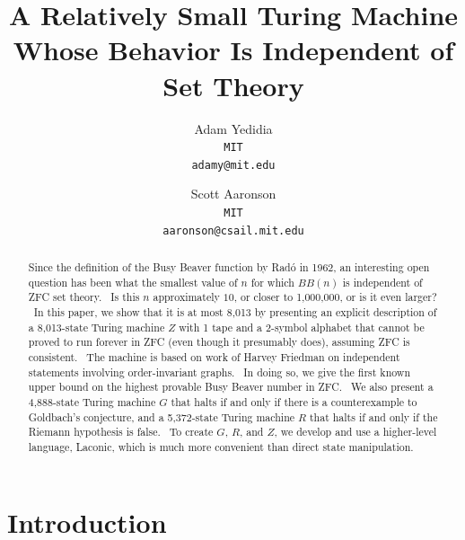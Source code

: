 \documentclass[11pt]{article}
\newcommand{\statenumstate}{8,013-state }
\newcommand{\statenum}{8,013 }
\newcommand{\gbstatenumstate}{4,888-state }
\newcommand{\rmstatenumstate}{5,372-state }
\begin{document}
\title{A Relatively Small Turing Machine Whose Behavior Is Independent of Set Theory}
\author{
    Adam Yedidia\\
    \small\texttt{MIT}\\
    \small\texttt{adamy@mit.edu}
    \and
    Scott Aaronson\\
    \small\texttt{MIT}\\
    \small\texttt{aaronson@csail.mit.edu}
}
\maketitle

\begin{abstract}

Since the definition of the Busy Beaver function by Rad\'{o} in 1962, an interesting open question has been what the smallest value of $n$ for which $BB(n)$ is independent of ZFC set theory. \ Is this $n$ approximately $10$, or closer to 1,000,000, or is it even larger? \ In this paper, we show that it is at most \statenum by presenting an explicit description of a \statenumstate Turing machine $Z$ with 1 tape and a 2-symbol alphabet that cannot be proved to run forever in ZFC (even though it presumably does), assuming ZFC is consistent. \ The machine is based on work of Harvey Friedman on independent statements involving order-invariant graphs. \ In doing so, we give the first known upper bound on the highest provable Busy Beaver number in ZFC. \ We also present a \gbstatenumstate Turing machine $G$ that halts if and only if there is a counterexample to Goldbach's conjecture, and a \rmstatenumstate Turing machine $R$ that halts if and only if the Riemann hypothesis is false. \ To create $G$, $R$, and $Z$, we develop and use a higher-level language, Laconic, which is much more convenient than direct state manipulation.

\end{abstract}

\section{Introduction}

\end{document}
